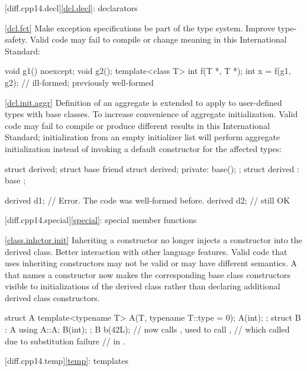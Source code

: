[diff.cpp14.decl]{\ref{dcl.decl}: declarators}

\ref{dcl.fct}
\change Make exception specifications be part of the type system.
\rationale Improve type-safety.
\effect
Valid \CppXIV code may fail to compile or change meaning in this
International Standard:

\begin{codeblock}
void g1() noexcept;
void g2();
template<class T> int f(T *, T *);
int x = f(g1, g2);    // ill-formed; previously well-formed
\end{codeblock}

\ref{dcl.init.aggr}
\change Definition of an aggregate is extended
to apply to user-defined types with base classes.
\rationale To increase convenience of aggregate initialization.
\effect
Valid \CppXIV code may fail to compile or produce different results in this
International Standard; initialization from an empty initializer list will
perform aggregate initialization instead of invoking a default constructor
for the affected types:
\begin{codeblock}
struct derived;
struct base {
  friend struct derived;
private:
  base();
};
struct derived : base {};

derived d1{};       // Error. The code was well-formed before.
derived d2;         // still OK
\end{codeblock}

[diff.cpp14.special]{\ref{special}: special member functions}

\ref{class.inhctor.init}
\change
Inheriting a constructor no longer injects a constructor into the derived class.
\rationale
Better interaction with other language features.
\effect
Valid \CppXIV code that uses inheriting constructors may not be valid
or may have different semantics. A 
that names a constructor now makes the corresponding base class constructors
visible to initializations of the derived class
rather than declaring additional derived class constructors.
\begin{codeblock}
struct A {
  template<typename T> A(T, typename T::type = 0);
  A(int);
};
struct B : A {
  using A::A;
  B(int);
};
B b(42L); // now calls , used to call ,
          // which called  due to substitution failure
          // in .
\end{codeblock}

[diff.cpp14.temp]{\ref{temp}: templates}

